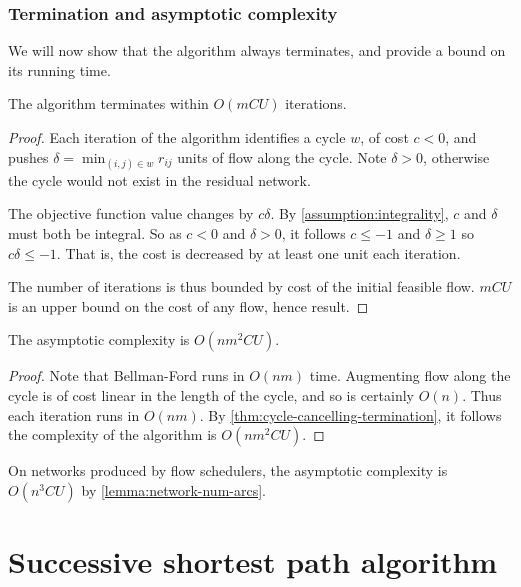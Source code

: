 \subsubsection{Termination and asymptotic complexity}

We will now show that the algorithm always terminates, and provide a bound on its running time.\\

\begin{thm} \label{thm:cycle-cancelling-termination}
The algorithm terminates within $O(mCU)$ iterations.
\end{thm}
\begin{proof}
Each iteration of the algorithm identifies a cycle $w$, of cost $c < 0$, and pushes $\delta = \min_{(i,j) \in w} r_{ij}$ units of flow along the cycle. Note $\delta > 0$, otherwise the cycle would not exist in the residual network. 

The objective function value changes by $c\delta$.  By \cref{assumption:integrality}, $c$ and $\delta$ must both be integral. So as $c < 0$ and $\delta > 0$, it follows $c \leq -1$ and $\delta \geq 1$ so $c\delta \leq -1$. That is, the cost is decreased by at least one unit each iteration.

The number of iterations is thus bounded by cost of the initial feasible flow. $mCU$ is an upper bound on the cost of any flow, hence result.
\end{proof}

\begin{cor} \label{corollary:cycle-cancelling-complexity}
The asymptotic complexity is $O(nm^2CU)$.
\end{cor}
\begin{proof}
Note that Bellman-Ford runs in $O(nm)$ time. Augmenting flow along the cycle is of cost linear in the length of the cycle, and so is certainly $O(n)$. Thus each iteration runs in $O(nm)$. By \cref{thm:cycle-cancelling-termination}, it follows the complexity of the algorithm is $O(nm^2CU)$.
\end{proof}

\begin{remark}
On networks produced by flow schedulers, the asymptotic complexity is $O(n^3CU)$ by \cref{lemma:network-num-arcs}.
\end{remark}

\section{Successive shortest path algorithm} \label{sec:impl-ssp}

